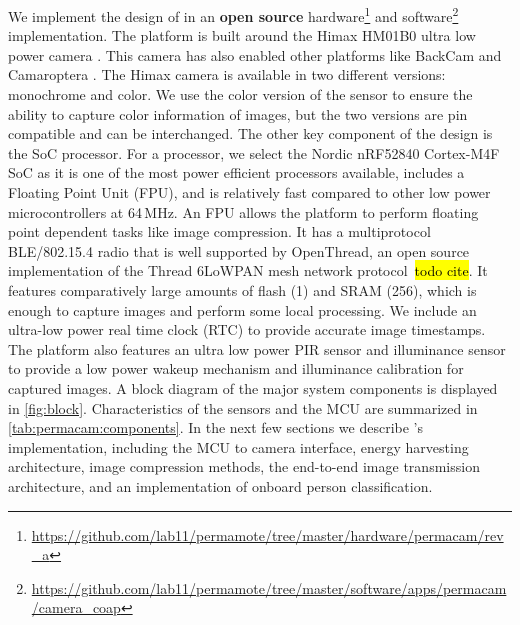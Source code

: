 We implement the design of \namec{} in an \textbf{open source}
hardware\footnote{\url{https://github.com/lab11/permamote/tree/master/hardware/permacam/rev_a}}
and software\footnote{\url{https://github.com/lab11/permamote/tree/master/software/apps/permacam/camera_coap}}
implementation. The platform is built around the Himax HM01B0 ultra low power camera \cite{hm01b0}. This camera has also enabled other platforms like BackCam \cite{josephson2019wireless} and Camaroptera \cite{nardello2019camaroptera}. The Himax camera is available in two different versions: monochrome and color. 
We use the color version of the sensor to ensure the ability to capture color information of images, but the two versions are pin compatible and can be interchanged. The other key component of the design is the SoC processor. 
For a processor, we select the Nordic nRF52840 Cortex-M4F SoC as it is one of the most power efficient processors available, includes a Floating Point Unit (FPU), and is relatively fast compared to other low power microcontrollers at 64\,MHz. 
An FPU allows the platform to perform floating point dependent tasks like image compression. 
It has a multiprotocol BLE/802.15.4 radio that is well supported by OpenThread, an open source implementation of the Thread 6LoWPAN mesh network protocol~\hl{todo cite}. 
It features comparatively large amounts of flash (1\ssi{\mega\byte}) and SRAM (256\ssi{\mega\byte}), which is enough to capture images and perform some local processing. 
We include an ultra-low power real time clock (RTC) to provide accurate image timestamps. 
The platform also features an ultra low power PIR sensor and illuminance sensor to provide a low power wakeup mechanism and illuminance calibration for captured images. 
A block diagram of the major system components is displayed in \cref{fig:block}. 
Characteristics of the sensors and the MCU are summarized in \cref{tab:permacam:components}. 
In the next few sections we describe \namec{}'s implementation, including the MCU to camera interface, energy harvesting architecture, image compression methods, the end-to-end image transmission architecture, and an implementation of onboard person classification.


